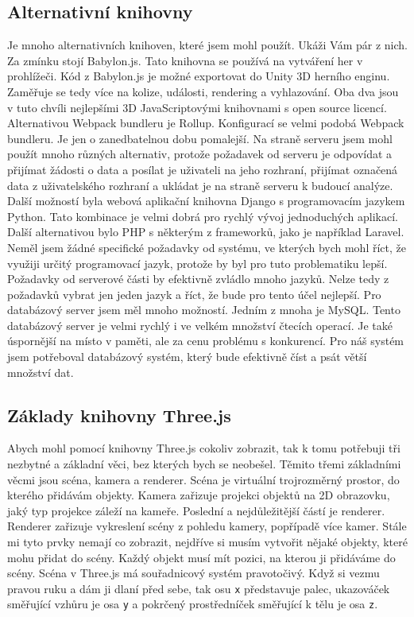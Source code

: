 \documentclass[czech,bachelor,dept420,male,cpdeclaration]{diploma}
\begin{document}
\subsection{Alternativní knihovny} 
Je mnoho alternativních knihoven, které jsem mohl použít. Ukáži Vám pár z nich. Za zmínku stojí Babylon.js. Tato knihovna se používá na vytváření her v prohlížeči. Kód z Babylon.js je možné exportovat do Unity 3D herního enginu. Zaměřuje se tedy více na kolize, události, rendering a vyhlazování. Oba dva jsou v tuto chvíli nejlepšími 3D JavaScriptovými knihovnami s open source licencí. Alternativou Webpack bundleru je Rollup. Konfigurací se velmi podobá Webpack bundleru. Je jen o zanedbatelnou dobu pomalejší. Na straně serveru jsem mohl použít mnoho různých alternativ, protože požadavek od serveru je odpovídat a přijímat žádosti o data a posílat je uživateli na jeho rozhraní, přijímat označená data z uživatelského rozhraní a ukládat je na straně serveru k budoucí analýze. Další možností byla webová aplikační knihovna Django s programovacím jazykem Python. Tato kombinace je velmi dobrá pro rychlý vývoj jednoduchých aplikací. Další alternativou bylo PHP s některým z frameworků, jako je například Laravel. Neměl jsem žádné specifické požadavky od systému, ve kterých bych mohl říct, že využiji určitý programovací jazyk, protože by byl pro tuto problematiku lepší. Požadavky od serverové části by efektivně zvládlo mnoho jazyků. Nelze tedy z požadavků vybrat jen jeden jazyk a říct, že bude pro tento účel nejlepší. Pro databázový server jsem měl mnoho možností. Jedním z mnoha je MySQL. Tento databázový server je velmi rychlý i ve velkém množství čtecích operací. Je také úspornější na místo v paměti, ale za cenu problému s konkurencí. Pro náš systém jsem potřeboval databázový systém, který bude efektivně číst a psát větší množství dat.


\subsection{Základy knihovny Three.js}
Abych mohl pomocí knihovny Three.js cokoliv zobrazit, tak k tomu potřebuji tři nezbytné a základní věci, bez kterých bych se neobešel. Těmito třemi základními věcmi jsou scéna, kamera a renderer. Scéna je virtuální trojrozměrný prostor, do kterého přidávám objekty. Kamera zařizuje projekci objektů na 2D obrazovku, jaký typ projekce záleží na kameře. Poslední a nejdůležitější částí je renderer. Renderer zařizuje vykreslení scény z pohledu kamery, popřípadě více kamer. Stále mi tyto prvky nemají co zobrazit, nejdříve si musím vytvořit nějaké objekty, které mohu přidat do scény. Každý objekt musí mít pozici, na kterou ji přidáváme do scény. Scéna v Three.js má souřadnicový systém pravotočivý. Když si vezmu pravou ruku a dám ji dlaní před sebe, tak osu \texttt{x} představuje palec, ukazováček směřující vzhůru je osa \texttt{y} a pokrčený  prostředníček směřující k tělu je osa \texttt{z}.
\end{document}
